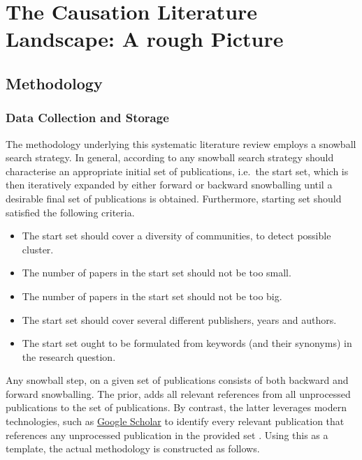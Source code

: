 \documentclass[11pt,a4paper]{book}
\theoremstyle{definition}
\theoremstyle{definition}
\theoremstyle{definition}
\theoremstyle{remark}
\begin{document}
\chapter{The Causation Literature Landscape: A rough Picture}

\section{Methodology}
\label{sec:methodology}

\subsection{Data Collection and Storage}
The methodology underlying this systematic literature review employs a snowball search strategy. 
In general, according to \parencite{wohlin2014guidelines} any snowball search strategy should characterise an appropriate initial set of publications, i.e.\ the start set, which is then iteratively expanded by either forward or backward snowballing until a desirable final set of publications is obtained.
Furthermore, starting set should satisfied the following criteria.
\begin{itemize}
\item The start set should cover a diversity of communities, to detect possible cluster.
\item The number of papers in the start set should not be too small.
\item The number of papers in the start set should not be too big.
\item The start set should cover several different publishers, years and authors.
\item The start set ought to be formulated from keywords (and their synonyms) in the research question.
\end{itemize}
Any snowball step, on a given set of publications consists of both backward and forward snowballing.
The prior, adds all relevant references from all unprocessed publications to the set of publications. By contrast, the latter leverages modern technologies, such as \href{https://scholar.google.at/}{Google Scholar} to identify every relevant publication that references any unprocessed publication in the provided set \parencite{wohlin2014guidelines}.
Using this as a template, the actual methodology is constructed as follows.
\end{document}
